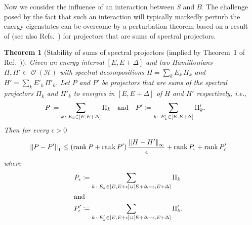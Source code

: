 \documentclass[a4paper,12pt,listof=totoc,index=totoc,bibliography=totoc,headsepline=false,headings=normal,BCOR16.153846mm,DIV12,headinclude,twoside,cleardoublepage=empty,numbers=noenddot,final]{scrreprt}
\theoremstyle{mystyle}
\numberwithin{equation}{section}
\numberwithin{figure}{section}
\numberwithin{lemma}{section}
\newtheorem{theorem}{Theorem}
\numberwithin{theorem}{section}
\numberwithin{corollary}{section}
\numberwithin{definition}{section}
\numberwithin{conjecture}{section}
\numberwithin{observation}{section}
\newcommand{\+}{\mkern2mu}
\newcommand{\coloneqq}{\mathrel{\vcentcolon\mkern-1.2mu=}} %
\newcommand{\union}{\cup}
\newcommand{\suchthat}{\colon}
\renewcommand{\H}{H}
\newcommand{\norm}[2][]{
  \ifthenelse{\equal{#1}{}}
    {\left\| {#2} \right\|}
    {\ifthenelse{\equal{#1}{uinv}}
      {\left\vert\kern-0.25ex\left\vert\kern-0.25ex\left\vert {#2} \right\vert\kern-0.25ex\right\vert\kern-0.25ex\right\vert}
      {\left\| {#2} \right\|_{#1}}
    }
}
\DeclareMathOperator{\1}{\mathds{1}}
\DeclareMathOperator{\Obs}{\mathcal{O}}
\DeclareMathOperator{\rank}{rank}
\newcommand{\mc}[1]{\mathcal{#1}}
\newcommand{\mcH}{\mc{H}}
\begin{document}
Now we consider the influence of an interaction between $S$ and $B$.
The challenge posed by the fact that such an interaction will typically markedly perturb the energy eigenstates can be overcome by a perturbation theorem based on a result of \textcite{bhatia} (see also Refs.~\cite{Chandler70,bhatia83}) for projectors that are sums of spectral projectors.
\begin{theorem}[Stability of sums of spectral projectors (implied by Theorem~1 of Ref.~\cite{Riera2012})] \label{thm:stabiityofsumsofspectralprojectors}
  Given an energy interval $[E,E+\Delta]$ and two Hamiltonians $\H,\H' \in \Obs(\mcH)$ with spectral decompositions $H = \sum_k E_k\,\Pi_k$ and $H' = \sum_k E'_k\,\Pi'_k$.
  Let $P$ and $P'$ be projectors that are sums of the spectral projectors $\Pi_k$ and $\Pi'_k$ to energies in $[E,E+\Delta]$ of $\H$ and $\H'$ respectively, i.e.,
  \begin{align} \label{eq:defofPandPprime}
    P &\coloneqq \sum_{k\suchthat E_k\in[E,E+\Delta]} \Pi_k & &\text{and}& P' &\coloneqq  \sum_{k\suchthat E'_k\in[E,E+\Delta]} \Pi'_k .
  \end{align}
  Then for every $\epsilon>0$
  \begin{equation}
    \norm[1]{P-P'} \leq (\rank P + \rank P')\, \frac{\norm[\infty]{\H-\H'}}{\epsilon} + \rank P_\epsilon + \rank P'_\epsilon
  \end{equation}
  where
  \begin{align}
    P_\epsilon &\coloneqq \sum_{k\suchthat E_k\in[E,E+\epsilon]\union[E+\Delta-\epsilon,E+\Delta]} \Pi_k \\
    \intertext{and}
    P'_\epsilon &\coloneqq  \sum_{k\suchthat E'_k\in[E,E+\epsilon]\union[E+\Delta-\epsilon,E+\Delta]} \Pi'_k .
  \end{align}
\end{theorem}
\end{document}
